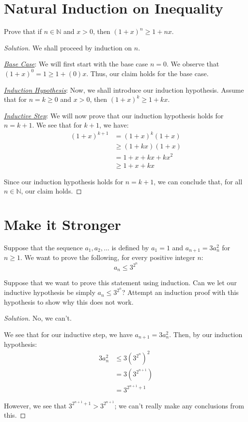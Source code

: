 \documentclass[openany]{book}
\newenvironment{solution}{\begin{proof}[Solution]}{\end{proof}}
\newcommand{\NN}{\mathbb{N}}
\begin{document}
\section{Natural Induction on Inequality}
\begin{hw}
	Prove that if $n \in \NN$ and $x > 0$, then $\left( 1+x \right)^{n} \geq 1+nx$.
\end{hw}
\begin{solution}
	We shall proceed by induction on $n$.
	
	\underline{\textit{Base Case}}: We will first start with the base case $n=0$. We observe that $\left( 1+x \right)^{0}=1 \geq 1+(0)x$. Thus, our claim holds for the base case.
	
	\underline{\textit{Induction Hypothesis}}: Now, we shall introduce our induction hypothesis. Assume that for $n=k\geq0$ and $x > 0$, then $\left( 1+x \right)^{k} \geq 1+kx$.
	
	\underline{\textit{Inductive Step}}: We will now prove that our induction hypothesis holds for $n=k+1$. We see that for $k+1$, we have:
	\begin{align*}
		(1+x)^{k+1} &= (1+x)^{k}(1+x) \\
		&\geq (1+kx)(1+x) \tag{by our induction hypothesis} \\
		&= 1+x+kx+kx^{2} \\
		&\geq 1+x+kx \tag{$1+(k+1)x=1+x+kx$}
	\end{align*}

	Since our induction hypothesis holds for $n=k+1$, we can conclude that, for all $n\in \NN$, our claim holds.
\end{solution}

\section{Make it Stronger}
Suppose that the sequence $a_{1}, a_{2}, \ldots$ is defined by $a_{1}=1$ and $a_{n+1}=3a^{2}_{n}$ for $n \geq 1$. We want to prove the following, for every positive integer $n$:
\begin{equation*}
	a_{n} \leq 3^{2^{n}}
\end{equation*}

\begin{hw}
	Suppose that we want to prove this statement using induction. Can we let our inductive hypothesis be simply $a_{n} \leq 3^{2^{n}}$? Attempt an induction proof with this hypothesis to show why this does not work.
\end{hw}
\begin{solution}
	No, we can't.
	
	We see that for our inductive step, we have $a_{n+1}=3a^{2}_{n}$. Then, by our induction hypothesis:
	\begin{align*}
		3a^{2}_{n} &\leq 3\left( 3^{2^{n}} \right)^{2} \\
		&= 3\left( 3^{2^{n+1}} \right) \\
		&= 3^{2^{n+1}+1}
	\end{align*}

	However, we see that $3^{2^{n+1}+1} > 3^{2^{n+1}}$; we can't really make any conclusions from this.
\end{solution}
\end{document}
